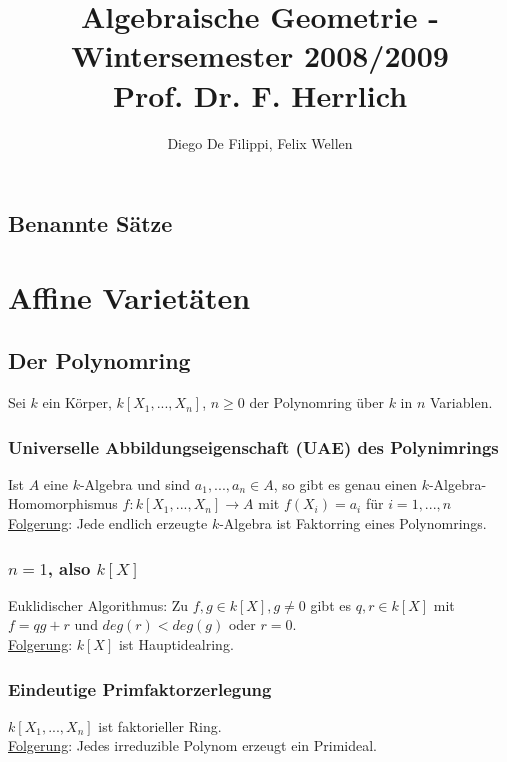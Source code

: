 \documentclass[a4paper,12pt]{report}
\title{Algebraische Geometrie - Wintersemester 2008/2009\\ Prof. Dr. F. Herrlich}
\author{Diego De Filippi, Felix Wellen}
\theoremstyle{break}
\theoremstyle{nonumberbreak}
\theoremstyle{nonumberplain}
\begin{document}
\maketitle

\setlength\parskip{0.6pt}
\tableofcontents

\section*{Benannte Sätze}


\setlength\parskip{\smallskipamount}


\chapter{Affine Varietäten}
\section{Der Polynomring}
Sei $k$ ein Körper, $k[X_1,...,X_n]$, $n\geq 0$ der Polynomring über $k$ in $n$ Variablen.
\subsection{Universelle Abbildungseigenschaft (UAE) des Polynimrings}
Ist $A$ eine $k$-Algebra und sind $a_1,...,a_n\in A$, so gibt es genau einen $k$-Algebra-Homomorphismus $f: k[X_1,...,X_n] \rightarrow A$ mit $f(X_i)=a_i$ für $i= 1,...,n$\\
\underline{Folgerung}: Jede endlich erzeugte $k$-Algebra ist Faktorring eines Polynomrings.
\subsection{$n=1$, also $k[X]$}
Euklidischer Algorithmus: Zu $f,g\in k[X], g\neq 0$ gibt es $q,r \in k[X]$ mit $f=qg+r$ und $deg(r)<deg(g)$ oder $r=0$.\\
\underline{Folgerung}: $k[X]$ ist Hauptidealring.
\subsection{Eindeutige Primfaktorzerlegung}
$k[X_1,...,X_n]$ ist faktorieller Ring.\\
\underline{Folgerung}: Jedes irreduzible Polynom erzeugt ein Primideal.
\end{document}
